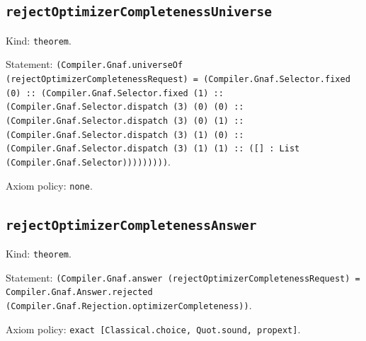\documentclass[11pt]{article}
\begin{document}
\subsection*{\texttt{rejectOptimizerCompletenessUniverse}}
\noindent Kind: \texttt{theorem}.\par
\noindent Statement: \texttt{(Compiler.Gnaf.universeOf (rejectOptimizerCompletenessRequest) = (Compiler.Gnaf.Selector.fixed (0) :: (Compiler.Gnaf.Selector.fixed (1) :: (Compiler.Gnaf.Selector.dispatch (3) (0) (0) :: (Compiler.Gnaf.Selector.dispatch (3) (0) (1) :: (Compiler.Gnaf.Selector.dispatch (3) (1) (0) :: (Compiler.Gnaf.Selector.dispatch (3) (1) (1) :: ([] : List (Compiler.Gnaf.Selector)))))))))}.\par
\noindent Axiom policy: \texttt{none}.\par
\subsection*{\texttt{rejectOptimizerCompletenessAnswer}}
\noindent Kind: \texttt{theorem}.\par
\noindent Statement: \texttt{(Compiler.Gnaf.answer (rejectOptimizerCompletenessRequest) = Compiler.Gnaf.Answer.rejected (Compiler.Gnaf.Rejection.optimizerCompleteness))}.\par
\noindent Axiom policy: \texttt{exact [Classical.choice, Quot.sound, propext]}.\par
\end{document}
